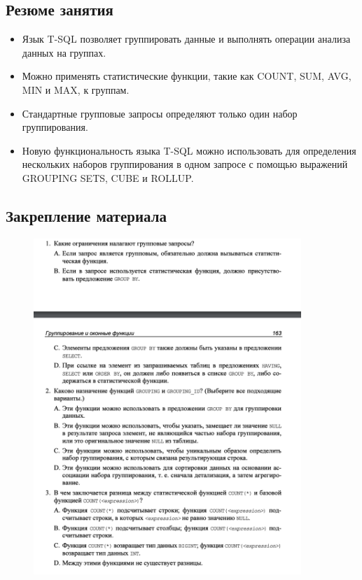 \subsection*{Резюме занятия}
\begin{itemize}
	\item Язык T-SQL позволяет группировать данные и выполнять операции анализа
	данных на группах. 
	\item Можно применять статистические функции, такие как COUNT, SUM, AVG, MIN и MAX,
	к группам. 
	\item Стандартные групповые запросы определяют только один набор группирования. 
	\item Новую функциональность языка T-SQL можно использовать для определения
	нескольких наборов группирования в одном запросе с помощью выражений
	GROUPING SETS, CUBE и ROLLUP.  
\end{itemize}

\subsection*{Закрепление материала}

\begin{figure}[h!]
	\begin{center}
		\includegraphics[width=0.9\textwidth]{img/zakrep11.png}
	\end{center}
	\captionsetup{justification=centering}
\end{figure}
\newpage

